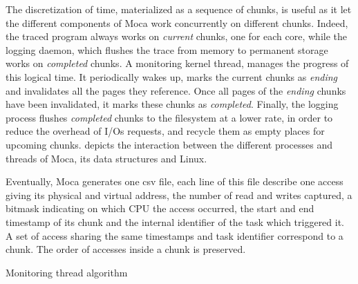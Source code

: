 The discretization of time, materialized as a sequence of chunks, is useful as it let the different components of \gls{Moca} work concurrently on different chunks.
Indeed, the traced program always works on \emph{current} chunks, one for each core, while the logging daemon, which flushes the trace from memory to permanent storage works on \emph{completed} chunks.
A monitoring kernel thread, manages the progress of this logical time.
It periodically wakes up, marks the current chunks as \emph{ending} and invalidates all the pages they reference.
Once all pages of the \emph{ending} chunks have been invalidated, it marks these chunks as \emph{completed}.
Finally, the logging process flushes \emph{completed} chunks to the filesystem at a lower rate, in order to reduce the overhead of I/Os requests, and recycle them as empty places for upcoming chunks.
  depicts the interaction between the different processes and threads of \gls{Moca}, its data structures and Linux.

Eventually, \gls{Moca} generates one csv file, each line of this file describe one access giving its physical and virtual address, the number of read and writes captured, a bitmask indicating on which CPU the access occurred, the start and end timestamp of its chunk and the internal identifier of the task which triggered it.
A set of access sharing the same timestamps and task identifier correspond to a chunk.
The order of accesses inside a chunk is preserved.

\begin{algorithm}[htb]
    \caption{Monitoring thread algorithm}
    \label{algo:monTh}
    \begin{algorithmic}[1]
                \State {}
                        \State {}
                        \State {}
                        \State {}
                    \EndFor
                \State {}
            \EndFor
            \State {}
        \EndWhile
    \end{algorithmic}
\end{algorithm}

